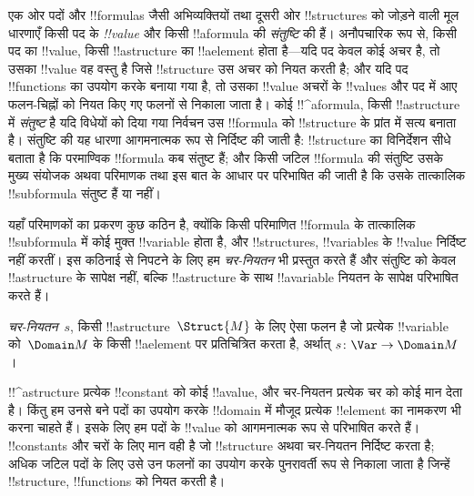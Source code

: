 \documentclass[../../../include/open-logic-section]{subfiles}
\begin{document}


\begin{explain}
एक ओर पदों और !!{formula}s जैसी अभिव्यक्तियों तथा दूसरी ओर !!{structure}s
को जोड़ने वाली मूल धारणाएँ किसी पद के \emph{!!{value}} और किसी
!!a{formula} की \emph{संतुष्टि} की हैं। अनौपचारिक रूप से, किसी पद का
!!{value}, किसी !!a{structure} का !!a{element} होता है---यदि पद केवल कोई
अचर है, तो उसका !!{value} वह वस्तु है जिसे !!{structure} उस अचर को
नियत करती है; और यदि पद !!{function}s का उपयोग करके बनाया गया है, तो उसका
  !!{value} अचरों के !!{value}s और पद में आए फलन-चिह्नों को नियत किए
गए फलनों से निकाला जाता है। कोई !!^a{formula}, किसी !!a{structure} में
  \emph{संतुष्ट} है यदि विधेयों को दिया गया निर्वचन उस !!{formula} को
  !!{structure} के प्रांत में सत्य बनाता है। संतुष्टि की यह धारणा आगमनात्मक रूप से निर्दिष्ट
की जाती है: !!{structure} का विनिर्देशन सीधे बताता है कि परमाण्विक
!!{formula} कब संतुष्ट हैं; और किसी जटिल !!{formula} की संतुष्टि उसके मुख्य
संयोजक अथवा परिमाणक तथा इस बात के आधार पर परिभाषित की जाती है कि उसके
तात्कालिक !!{subformula} संतुष्ट हैं या नहीं।

यहाँ परिमाणकों का प्रकरण कुछ कठिन है, क्योंकि किसी परिमाणित !!{formula} के
तात्कालिक !!{subformula} में कोई मुक्त !!{variable} होता है, और
!!{structure}s, !!{variable}s के !!{value} निर्दिष्ट नहीं करतीं। इस कठिनाई
से निपटने के लिए हम \emph{चर-नियतन} भी प्रस्तुत करते हैं और संतुष्टि को केवल
!!a{structure} के सापेक्ष नहीं, बल्कि !!a{structure} के साथ !!a{variable}
नियतन के सापेक्ष परिभाषित करते हैं।
\end{explain}

\begin{defn}[चर-नियतन]
\emph{चर-नियतन}~$s$, किसी !!a{structure}~$\Struct{M}$ के लिए ऐसा फलन है
जो प्रत्येक !!{variable} को~$\Domain M$ के किसी !!a{element} पर
प्रतिचित्रित करता है, अर्थात् $s\colon \Var \to \Domain M$।
\end{defn}

\begin{explain}
!!^a{structure} प्रत्येक !!{constant} को कोई !!a{value}, और चर-नियतन
प्रत्येक चर को कोई मान देता है। किंतु हम उनसे बने पदों का उपयोग करके
!!{domain} में मौजूद प्रत्येक !!{element} का नामकरण भी करना चाहते हैं। इसके लिए हम पदों के
!!{value} को आगमनात्मक रूप से परिभाषित करते हैं। !!{constant}s और चरों के
लिए मान वही है जो !!{structure} अथवा चर-नियतन निर्दिष्ट करता है; अधिक जटिल
पदों के लिए उसे उन फलनों का उपयोग करके पुनरावर्ती रूप से निकाला जाता है
जिन्हें !!{structure}, !!{function}s को नियत करती है।
\end{explain}
\end{document}
